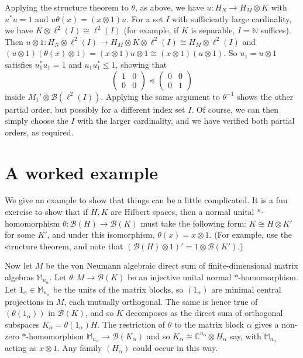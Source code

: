 \documentclass[a4paper,11pt]{article}
\theoremstyle{plain}
\theoremstyle{remark}
\newcommand{\mc}[1]{\mathcal{#1}}
\newcommand{\vnten}{\bar\otimes}
\begin{document}
Applying the structure theorem to $\theta$, as above, we have $u\colon H_N \to H_M \otimes K$ with $u^*u=1$ and $u\theta(x) = (x\otimes 1)u$.  For a set $I$ with sufficiently large cardinality, we have $K \otimes \ell^2(I) \cong \ell^2(I)$ (for example, if $K$ is separable, $I=\mathbb N$ suffices).  Then $u\otimes 1 \colon H_N \otimes \ell^2(I) \to H_M \otimes K \otimes \ell^2(I) \cong H_M \otimes \ell^2(I)$ and $(u\otimes 1)(\theta(x)\otimes 1) = (x\otimes 1)u\otimes 1 \cong (x\otimes 1)(u\otimes 1)$.  So $u_1 = u\otimes 1$ satisfies $u_1^*u_1=1$ and $u_1u_1^* \leq 1$, showing that
\[ \begin{pmatrix} 1 & 0 \\ 0 & 0 \end{pmatrix} \preceq \begin{pmatrix} 0 & 0 \\ 0 & 1 \end{pmatrix} \]
inside $M_1' \vnten \mc B(\ell^2(I))$.  Applying the same argument to $\theta^{-1}$ shows the other partial order, but possibly for a different index set $I$.  Of course, we can then simply choose the $I$ with the larger cardinality, and we have verified both partial orders, as required.


\section{A worked example}

We give an example to show that things can be a little complicated.  It is a fun exercise to show that if $H,K$ are Hilbert spaces, then a normal unital $*$-homomorphism $\theta \colon \mc B(H)\to \mc B(K)$ must take the following form: $K\cong H\otimes K'$ for some $K'$, and under this isomorphism, $\theta(x)=x\otimes 1$.  (For example, use the structure theorem, and note that $(\mc B(H)\otimes 1)' = 1\otimes\mc B(K')$.)

Now let $M$ be the von Neumann algebraic direct sum of finite-dimensional matrix algebras $\mathbb M_{n_\alpha}$.  Let $\theta \colon M \to \mc B(K)$ be an injective unital normal $*$-homomorphism.  Let $1_\alpha \in \mathbb M_{n_\alpha}$ be the units of the matrix blocks, so $(1_\alpha)$ are minimal central projections in $M$, each mutually orthogonal.  The same is hence true of $(\theta(1_\alpha))$ in $\mc B(K)$, and so $K$ decomposes as the direct sum of orthogonal subspaces $K_\alpha = \theta(1_\alpha)H$.  The restriction of $\theta$ to the matrix block $\alpha$ gives a non-zero $*$-homomorphism $\mathbb M_{n_\alpha} \to \mc B(K_\alpha)$ and so $K_\alpha \cong \mathbb C^{n_\alpha} \otimes H_\alpha$ say, with $\mathbb M_{n_\alpha}$ acting as $x\otimes 1$.  Any family $(H_\alpha)$ could occur in this way.
\end{document}
